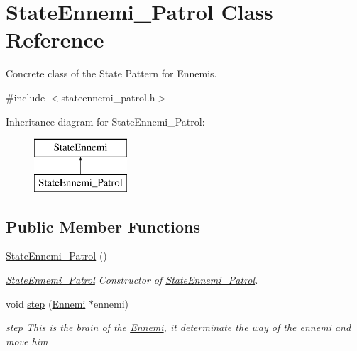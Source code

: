 \hypertarget{class_state_ennemi___patrol}{}\section{State\+Ennemi\+\_\+\+Patrol Class Reference}
\label{class_state_ennemi___patrol}


Concrete class of the State Pattern for Ennemis.  




{\ttfamily \#include $<$stateennemi\+\_\+patrol.\+h$>$}

Inheritance diagram for State\+Ennemi\+\_\+\+Patrol\+:\begin{figure}[H]
\begin{center}
\leavevmode
\includegraphics[height=2.000000cm]{class_state_ennemi___patrol}
\end{center}
\end{figure}
\subsection*{Public Member Functions}
\begin{DoxyCompactItemize}
\item 
\hypertarget{class_state_ennemi___patrol_adc38ffd909b82bd049d309541bafd6b9}{}\hyperlink{class_state_ennemi___patrol_adc38ffd909b82bd049d309541bafd6b9}{State\+Ennemi\+\_\+\+Patrol} ()\label{class_state_ennemi___patrol_adc38ffd909b82bd049d309541bafd6b9}

\begin{DoxyCompactList}\small\item\em \hyperlink{class_state_ennemi___patrol}{State\+Ennemi\+\_\+\+Patrol} Constructor of \hyperlink{class_state_ennemi___patrol}{State\+Ennemi\+\_\+\+Patrol}. \end{DoxyCompactList}\item 
void \hyperlink{class_state_ennemi___patrol_a79492b24068ff2934defd920651f8a0c}{step} (\hyperlink{class_ennemi}{Ennemi} $\ast$ennemi)
\begin{DoxyCompactList}\small\item\em step This is the brain of the \hyperlink{class_ennemi}{Ennemi}, it determinate the way of the ennemi and move him \end{DoxyCompactList}\end{DoxyCompactItemize}


